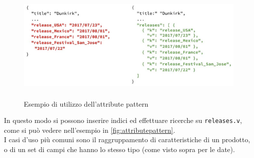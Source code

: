 \begin{figure}[htbp]
\begin{center}
\includegraphics[height=15em]{immagini/attribute-pattern.png}
\caption{Esempio di utilizzo dell'attribute pattern}
\label{fig:attributepattern}
\end{center}
\end{figure}

\noindent In questo modo si possono inserire indici ed effettuare ricerche su \texttt{releases.v}, come si può vedere nell'esempio in \autoref{fig:attributepattern}.\\
I casi d'uso più comuni sono il raggruppamento di caratteristiche di un prodotto, o di un set di campi che hanno lo stesso tipo (come visto sopra per le date).

